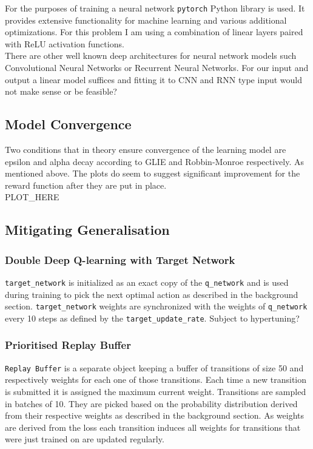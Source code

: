 For the purposes of training a neural network \texttt{pytorch}
Python library is used. It provides extensive functionality
for machine learning and various additional optimizations.
For this problem I am using a combination of linear layers
paired with ReLU activation functions. \\

There are other well known deep architectures for neural
network models such Convolutional Neural Networks or 
Recurrent Neural Networks. For our input and output 
a linear model suffices and fitting it to CNN and RNN
type input would not make sense or be feasible?


\subsection{Model Convergence}
Two conditions that in theory ensure convergence of the 
learning model are epsilon and alpha decay according to 
GLIE and Robbin-Monroe respectively. As mentioned above.
The plots do seem to suggest significant improvement for the
reward function after they are put in place.\\

PLOT\_HERE

\subsection{Mitigating Generalisation}
\subsubsection{Double Deep Q-learning with Target Network}
\texttt{target\_network} is initialized as an exact copy of the 
\texttt{q\_network} and is used during training to pick the next 
optimal action as described in the background section. 
\texttt{target\_network} weights are synchronized with the
weights of \texttt{q\_network} every 10 steps as defined by the 
\texttt{target\_update\_rate}. Subject to hypertuning?

\subsubsection{Prioritised Replay Buffer}
\texttt{Replay Buffer} is a separate object keeping a buffer
of transitions of size 50 and respectively weights for each one 
of those transitions. Each time a new transition is submitted
it is assigned the maximum current weight. Transitions are 
sampled in batches of 10. They are picked based on the 
probability distribution derived from their respective weights
as described in the background section. As weights are derived 
from the loss each transition induces all weights for 
transitions that were just trained on are updated regularly. 

